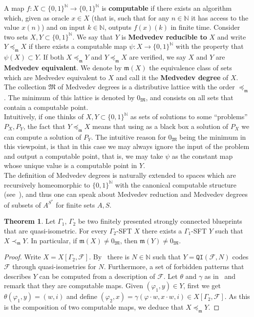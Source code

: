 \documentclass{article}
\theoremstyle{definition}
\newtheorem{theorem}{Theorem}[section] %
\theoremstyle{definition}
\newcommand{\NN}{\mathbb{N}}
\newcommand{\FF}{\mathcal{F}}
\newcommand{\QI}{\mathtt{QI}}
\newcommand{\define}[1]{\textbf{#1}}
\begin{document}
A map $f\colon X\subset \{0,1\}^{\NN}\to \{0,1\}^{\NN}$ is \define{computable} if there exists an algorithm which, given as oracle $x\in X$ (that is, such that for any $n \in \NN$ it has access to the value $x(n)$) and on input $k \in \NN$, outputs $f(x)(k)$ in finite time. Consider two sets $X,Y\subset \{0,1\}^{\NN}$. We say that $Y$ is \define{Medvedev reducible to} $X$ and write $Y \preceq_{\mathfrak{m}} X$ if there exists a computable map $\psi \colon X \to \{0,1\}^{\NN}$ with the property that $\psi(X)\subset Y$. If both $X\preceq_{\mathfrak{m}} Y$ and $Y\preceq_{\mathfrak{m}} X$ are verified, we say $X$ and $Y$ are \define{Medvedev equivalent}. We denote by $\mathfrak{m}(X)$ the equivalence class of sets which are Medvedev equivalent to $X$ and call it the \define{Medvedev degree} of $X$. The collection $\mathfrak{M}$ of Medvedev degrees is a distributive lattice with the order $\preceq_{\mathfrak{m}}$. The minimum of this lattice is denoted by $0_{\mathfrak{M}}$, and consists on all sets that contain a computable point.\\

Intuitively, if one thinks of $X,Y\subset \{0,1\}^{\NN}$ as sets of solutions to some ``problems'' $P_X,P_Y$, the fact that $Y \preceq_{\mathfrak{m}} X$ means that using as a black box a solution of $P_X$ we can compute a solution of $P_Y$. The intuitive reason for $0_{\mathfrak{M}}$ being the minimum in this viewpoint, is that in this case we may always ignore the input of the problem and output a computable point, that is, we may take $\psi$ as the constant map whose unique value is a computable point in $Y$. \\

The definition of Medvedev degrees is naturally extended to spaces which are recursively homeomorphic to $\{0,1\}^{\NN}$ with the canonical computable structure (see~\cite{barbieri2024medvedev}), and thus one can speak about Medvedev reduction and Medvedev degrees of subsets of $A^{S^*}$ for finite sets $A,S$. 

\begin{theorem}\label{thm:medvedev_noassumpt}
    Let $\Gamma_1$, $\Gamma_2$ be two finitely presented strongly connected blueprints that are quasi-isometric. For every $\Gamma_2$-SFT $X$ there exists a $\Gamma_1$-SFT $Y$ such that $X \prec_{\mathfrak{m}} Y$. In particular, if $\mathfrak{m}(X) \neq 0_{\mathfrak{M}}$, then $\mathfrak{m}(Y) \neq 0_{\mathfrak{M}}$.
    \end{theorem}

    \begin{proof}
        Write $X=X[\Gamma_2,\FF]$. By~ there is $N\in \NN$ such that $Y = \QI(\FF,N)$ codes $\FF$ through quasi-isometries for $N$. Furthermore, a set of forbidden patterns that describes $Y$ can be computed from a description of $\FF$. Let $\theta$ and $\gamma$ as in~ and remark that they are computable maps. Given $(\varphi_1,y)\in Y$, first we get $\theta(\varphi_1,y) = (w,i)$ and define $(\varphi_2,x) = \gamma(\varphi \cdot w,x\cdot w,i) \in X[\Gamma_2,\FF]$. As this is the composition of two computable maps, we deduce that $X \preceq_{\mathfrak{m}} Y$.
    \end{proof}
    
\end{document}
